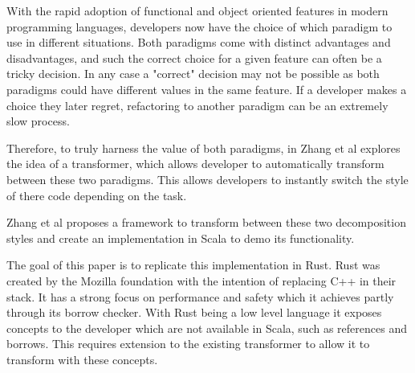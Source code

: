 \documentclass[ oneside,%
                    author={James Elgar},
                    degree={MEng},
                     title={Bidirectional transformer between functional and \\ object-oriented programming in Rust},
                  subtitle={}]{dissertation}
\newcommand{\weixin}{Zhang et al }
\begin{document}



\noindent
With the rapid adoption of functional and object oriented features in modern programming languages, developers now have the choice of which paradigm to use in different situations. Both paradigms come with distinct advantages and disadvantages, and such the correct choice for a given feature can often be a tricky decision. In any case a "correct" decision may not be possible as both paradigms could have different values in the same feature. If a developer makes a choice they later regret, refactoring to another paradigm can be an extremely slow process.

Therefore, to truly harness the value of both paradigms, in \cite{food} \weixin explores the idea of a transformer, which allows developer to automatically transform between these two paradigms. This allows developers to instantly switch the style of there code depending on the task.

\weixin proposes a framework to transform between these two decomposition styles and create an implementation in Scala to demo its functionality.

The goal of this paper is to replicate this implementation in Rust. Rust was created by the Mozilla foundation with the intention of replacing C++ in their stack. It has a strong focus on performance and safety which it achieves partly through its borrow checker. With Rust being a low level language it exposes concepts to the developer which are not available in Scala, such as references and borrows. This requires extension to the existing transformer to allow it to transform with these concepts. 
\end{document}
